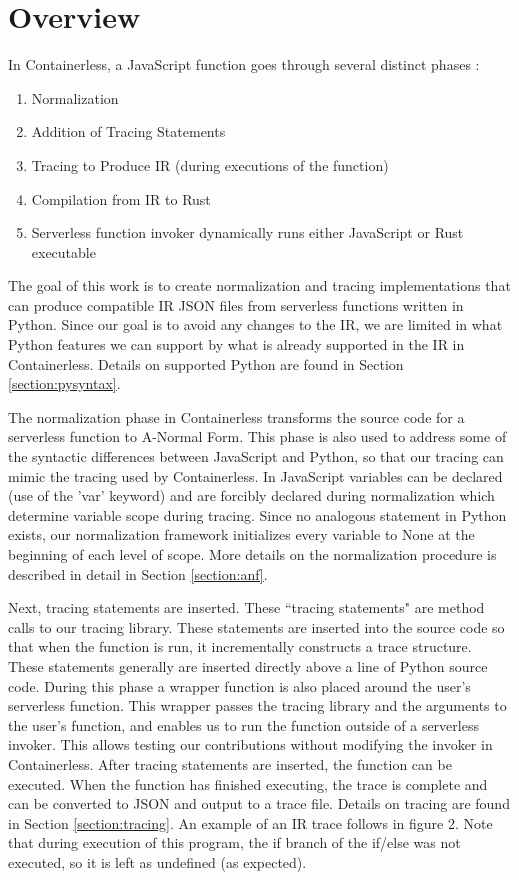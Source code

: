 \documentclass[acmsmall,review,authorversion]{acmart}
\begin{document}
\section{Overview}

In Containerless, a JavaScript function goes through several distinct phases \cite{ServerlessAccel}:
\begin{enumerate}
    \item Normalization
    \item Addition of Tracing Statements
    \item Tracing to Produce IR (during executions of the function)
    \item Compilation from IR to Rust
    \item Serverless function invoker dynamically runs either JavaScript or Rust executable
\end{enumerate}
The goal of this work is to create normalization and tracing implementations that can produce compatible IR JSON files from serverless functions written in Python. Since our goal is to avoid any changes to the IR, we are limited in what Python features we can support by what is already supported in the IR in Containerless. Details on supported Python are found in Section \ref{section:pysyntax}.
\par
The normalization phase in Containerless transforms the source code for a serverless function to A-Normal Form. This phase is also used to address some of the syntactic differences between JavaScript and Python, so that our tracing can mimic the tracing used by Containerless. In JavaScript variables can be declared (use of the 'var' keyword) and are forcibly declared during normalization which determine variable scope during tracing. Since no analogous statement in Python exists, our normalization framework initializes every variable to None at the beginning of each level of scope.  More details on the normalization procedure is described in detail in Section \ref{section:anf}.
\par
Next, tracing statements are inserted. These ``tracing statements" are method calls to our tracing library. These statements are inserted into the source code so that when the function is run, it incrementally constructs a trace structure. These statements generally are inserted directly above a line of Python source code. During this phase a wrapper function is also placed around the user's serverless function. This wrapper passes the tracing library and the arguments to the user's function, and enables us to run the function outside of a serverless invoker. This allows testing our contributions without modifying the invoker in Containerless. After tracing statements are inserted, the function can be executed. When the function has finished executing, the trace is complete and can be converted to JSON and output to a trace file. Details on tracing are found in Section \ref{section:tracing}. An example of an IR trace follows in figure 2. Note that during execution of this program, the if branch of the if/else was not executed, so it is left as undefined (as expected).
\end{document}
